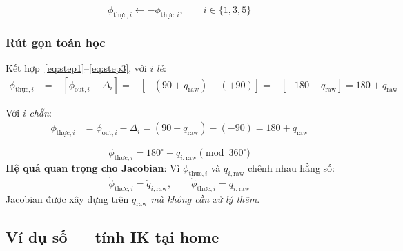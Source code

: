 \documentclass[12pt,a4paper]{article}
\begin{document}
\begin{equation}
  \phi_{\text{thực},i} \leftarrow -\phi_{\text{thực},i}, \qquad i \in \{1{,}3{,}5\}
  \label{eq:step3}
\end{equation}

\subsubsection{Rút gọn toán học}

Kết hợp~\eqref{eq:step1}--\eqref{eq:step3}, với $i$ \textit{lẻ}:
\begin{align}
  \phi_{\text{thực},i}
  &= -\left[\phi_{\text{out},i} - \Delta_i\right]
  = -\left[-(90+q_{\text{raw}}) - (+90)\right]
  = -\left[-180 - q_{\text{raw}}\right]
  = 180 + q_{\text{raw}}
\end{align}

Với $i$ \textit{chẵn}:
\begin{align}
  \phi_{\text{thực},i}
  &= \phi_{\text{out},i} - \Delta_i
  = (90+q_{\text{raw}}) - (-90)
  = 180 + q_{\text{raw}}
\end{align}

\begin{resultbox}[frametitle={Kết quả rút gọn --- đúng cho cả 6 chân}]
\begin{equation}
  \phi_{\text{thực},i} = 180^{\circ} + q_{i,\text{raw}} \pmod{360^{\circ}}
  \label{eq:phi_thuc}
\end{equation}
\textbf{Hệ quả quan trọng cho Jacobian}:
Vì $\phi_{\text{thực},i}$ và $q_{i,\text{raw}}$ chênh nhau hằng số:
\begin{equation}
  \dot{\phi}_{\text{thực},i} = \dot{q}_{i,\text{raw}}, \qquad
  \ddot{\phi}_{\text{thực},i} = \ddot{q}_{i,\text{raw}}
  \label{eq:deriv_equal}
\end{equation}
Jacobian được xây dựng trên $q_{\text{raw}}$ \textit{mà không cần xử lý thêm}.
\end{resultbox}

\subsection{Ví dụ số --- tính IK tại home}
\end{document}
